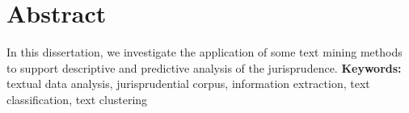 \chapter*{Abstract}
In this dissertation, we investigate the application of some text mining methods to support descriptive and predictive analysis of the jurisprudence.
\textbf{Keywords:} textual data analysis, jurisprudential corpus, information extraction, text classification, text clustering



